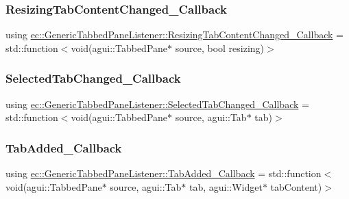 \subsubsection{\texorpdfstring{Resizing\+Tab\+Content\+Changed\+\_\+\+Callback}{ResizingTabContentChanged\_Callback}}
{\footnotesize\ttfamily using \mbox{\hyperlink{classec_1_1_generic_tabbed_pane_listener_a41097f0918f8888f9e970e9c9a5f0d52}{ec\+::\+Generic\+Tabbed\+Pane\+Listener\+::\+Resizing\+Tab\+Content\+Changed\+\_\+\+Callback}} =  std\+::function$<$void(agui\+::\+Tabbed\+Pane$\ast$ source, bool resizing)$>$}

\mbox{\label{classec_1_1_generic_tabbed_pane_listener_adbb9c0a73499ce6b26ba1c8569cb8525}} 
\subsubsection{\texorpdfstring{Selected\+Tab\+Changed\+\_\+\+Callback}{SelectedTabChanged\_Callback}}
{\footnotesize\ttfamily using \mbox{\hyperlink{classec_1_1_generic_tabbed_pane_listener_adbb9c0a73499ce6b26ba1c8569cb8525}{ec\+::\+Generic\+Tabbed\+Pane\+Listener\+::\+Selected\+Tab\+Changed\+\_\+\+Callback}} =  std\+::function$<$void(agui\+::\+Tabbed\+Pane$\ast$ source, agui\+::\+Tab$\ast$ tab)$>$}

\mbox{\label{classec_1_1_generic_tabbed_pane_listener_aef726cc6897d8994602cb127693e664d}} 
\subsubsection{\texorpdfstring{Tab\+Added\+\_\+\+Callback}{TabAdded\_Callback}}
{\footnotesize\ttfamily using \mbox{\hyperlink{classec_1_1_generic_tabbed_pane_listener_aef726cc6897d8994602cb127693e664d}{ec\+::\+Generic\+Tabbed\+Pane\+Listener\+::\+Tab\+Added\+\_\+\+Callback}} =  std\+::function$<$void(agui\+::\+Tabbed\+Pane$\ast$ source, agui\+::\+Tab$\ast$ tab, agui\+::\+Widget$\ast$ tab\+Content)$>$}

